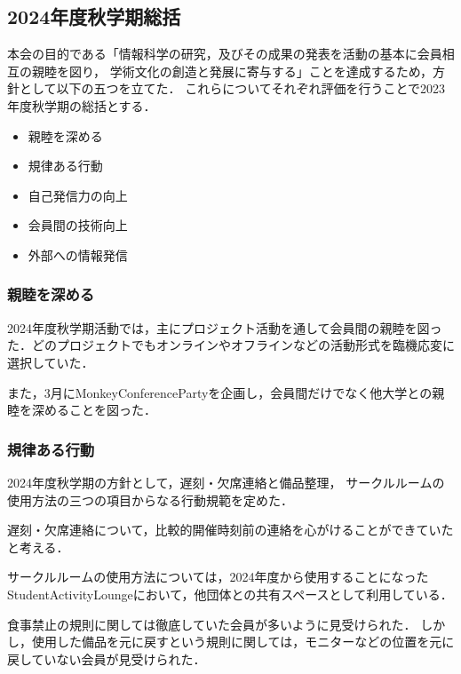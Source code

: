 \subsection*{2024年度秋学期総括}


本会の目的である「情報科学の研究，及びその成果の発表を活動の基本に会員相互の親睦を図り，
学術文化の創造と発展に寄与する」ことを達成するため，方針として以下の五つを立てた．
これらについてそれぞれ評価を行うことで2023年度秋学期の総括とする．

\begin{itemize}
    \item 親睦を深める
    \item 規律ある行動
    \item 自己発信力の向上
    \item 会員間の技術向上
    \item 外部への情報発信
\end{itemize}

\subsubsection*{親睦を深める}
    2024年度秋学期活動では，主にプロジェクト活動を通して会員間の親睦を図った．どのプロジェクトでもオンラインやオフラインなどの活動形式を臨機応変に選択していた．

    また，3月にMonkeyConferencePartyを企画し，会員間だけでなく他大学との親睦を深めることを図った．

\subsubsection*{規律ある行動}
    2024年度秋学期の方針として，遅刻・欠席連絡と備品整理，
    サークルルームの使用方法の三つの項目からなる行動規範を定めた．

    遅刻・欠席連絡について，比較的開催時刻前の連絡を心がけることができていたと考える．

    サークルルームの使用方法については，2024年度から使用することになったStudentActivityLoungeにおいて，他団体との共有スペースとして利用している．

    食事禁止の規則に関しては徹底していた会員が多いように見受けられた．
    しかし，使用した備品を元に戻すという規則に関しては，モニターなどの位置を元に戻していない会員が見受けられた．

